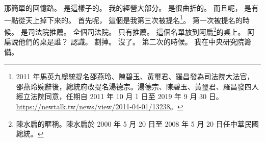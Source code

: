 \hypertarget{c01:cue:3047}{}那簡單的回憶路。
\hypertarget{c01:cue:3048}{}是這樣子的。
\hypertarget{c01:cue:3049}{}我的經營大部分。
\hypertarget{c01:cue:3050}{}是很曲折的。
\hypertarget{c01:cue:3051}{}而且呢，
\hypertarget{c01:cue:3052}{}是有一點從天上掉下來的。
\hypertarget{c01:cue:3053}{}首先呢，
\hypertarget{c01:cue:3054}{}這個是我第三次被提名\footnote{2011 年馬英九總統提名邵燕玲、陳碧玉、黃璽君、羅昌發為司法院大法官，邵燕玲婉辭後，總統府改提名湯德宗。湯德宗、陳碧玉、黃璽君、羅昌發四人經立法院同意，任期自 2011 年 10 月 1 日至 2019 年 9 月 30 日。\url{https://newtalk.tw/news/view/2011-04-01/13238}。}。
\hypertarget{c01:cue:3055}{}第一次被提名的時候。
\hypertarget{c01:cue:3056}{}是司法院推薦。
\hypertarget{c01:cue:3057}{}全個司法院。
\hypertarget{c01:cue:3058}{}只有推薦。
\hypertarget{c01:cue:3059}{}這個名單放到阿扁\footnote{陳水扁的暱稱。陳水扁於 2000 年 5 月 20 日至 2008 年 5 月 20 日任中華民國總統。}的桌上。
\hypertarget{c01:cue:3060}{}阿扁說他們的桌是誰？
\hypertarget{c01:cue:3061}{}認識。
\hypertarget{c01:cue:3062}{}劃掉。
\hypertarget{c01:cue:3063}{}沒了。
\hypertarget{c01:cue:3064}{}第二次的時候。
\hypertarget{c01:cue:3065}{}我在中央研究院籌備。

